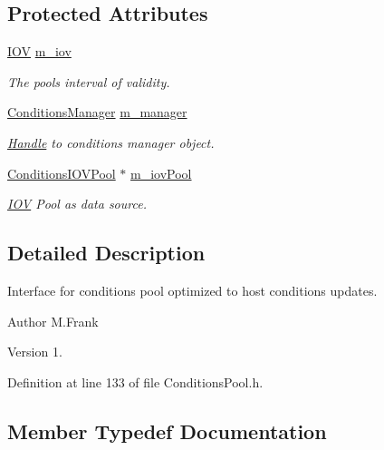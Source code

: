 \subsection*{Protected Attributes}
\begin{DoxyCompactItemize}
\item 
\hyperlink{class_d_d4hep_1_1_i_o_v}{I\+OV} \hyperlink{class_d_d4hep_1_1_conditions_1_1_user_pool_a5d5c7664cba0150097ebb69b218d44f0}{m\+\_\+iov}
\begin{DoxyCompactList}\small\item\em The pool\textquotesingle{}s interval of validity. \end{DoxyCompactList}\item 
\hyperlink{class_d_d4hep_1_1_conditions_1_1_conditions_manager}{Conditions\+Manager} \hyperlink{class_d_d4hep_1_1_conditions_1_1_user_pool_a92b13c15de8a8982e6ff8e4f5d24566a}{m\+\_\+manager}
\begin{DoxyCompactList}\small\item\em \hyperlink{class_d_d4hep_1_1_handle}{Handle} to conditions manager object. \end{DoxyCompactList}\item 
\hyperlink{class_d_d4hep_1_1_conditions_1_1_conditions_i_o_v_pool}{Conditions\+I\+O\+V\+Pool} $\ast$ \hyperlink{class_d_d4hep_1_1_conditions_1_1_user_pool_a916051bc20a354a8c603be0bf0c54cac}{m\+\_\+iov\+Pool}
\begin{DoxyCompactList}\small\item\em \hyperlink{class_d_d4hep_1_1_i_o_v}{I\+OV} Pool as data source. \end{DoxyCompactList}\end{DoxyCompactItemize}


\subsection{Detailed Description}
Interface for conditions pool optimized to host conditions updates. 

\begin{DoxyAuthor}{Author}
M.\+Frank 
\end{DoxyAuthor}
\begin{DoxyVersion}{Version}
1. 
\end{DoxyVersion}


Definition at line 133 of file Conditions\+Pool.\+h.



\subsection{Member Typedef Documentation}
\hypertarget{class_d_d4hep_1_1_conditions_1_1_user_pool_a6282d01af77401a4c20f08391d18cc95}{}\label{class_d_d4hep_1_1_conditions_1_1_user_pool_a6282d01af77401a4c20f08391d18cc95} 
